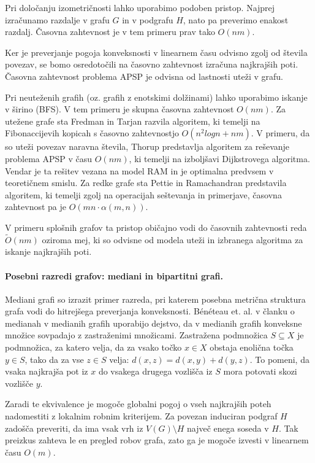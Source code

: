 \documentclass[sigconf
]{acmart}
\theoremstyle{definition}
\begin{document}
Pri določanju izometričnosti lahko uporabimo podoben pristop.
Najprej izračunamo razdalje v grafu \(G\) in v podgrafu \(H\), nato pa preverimo enakost razdalj. Časovna zahtevnost je v tem primeru prav tako \(O(nm)\).

Ker je preverjanje pogoja konveksnosti v linearnem času odvisno zgolj od števila povezav, se bomo osredotočili na časovno zahtevnost izračuna najkrajših poti.
Časovna zahtevnost problema APSP je odvisna od lastnosti uteži v grafu.

Pri neuteženih grafih (oz. grafih z enotskimi dolžinami) lahko uporabimo iskanje v širino (BFS).
V tem primeru je skupna časovna zahtevnost \(O(nm)\).
Za utežene grafe sta Fredman in Tarjan \cite{tarjanFredman1987} razvila algoritem, ki temelji na Fibonaccijevih kopicah s časovno zahtevnostjo \(O(n^2 logn + n m)\).
V primeru, da so uteži povezav naravna števila, Thorup \cite{thorup1999} predstavlja algoritem za reševanje problema APSP v času \(O(nm)\), ki temelji na izboljšavi Dijkstrovega algoritma.
Vendar je ta rešitev vezana na model RAM in je optimalna predvsem v teoretičnem smislu.
Za redke grafe sta Pettie in Ramachandran \cite{pettie2002} predstavila algoritem, ki temelji zgolj na operacijah seštevanja in primerjave, časovna zahtevnost pa je \(O(mn \cdot \alpha(m, n))\).

V primeru splošnih grafov ta pristop običajno vodi do časovnih zahtevnosti reda \(\tilde{O}(nm)\) oziroma mej, ki so odvisne od modela uteži in izbranega algoritma za iskanje najkrajših poti.

\paragraph{Posebni razredi grafov: mediani in bipartitni grafi.}
Mediani grafi so izrazit primer razreda, pri katerem posebna metrična struktura grafa vodi do hitrejšega preverjanja konveksnosti.
Bénéteau et. al. v članku o medianah v medianih grafih \cite{beneteau2022medians} uporabijo dejstvo, da v medianih grafih konveksne množice sovpadajo z zastraženimi množicami.
Zastražena podmnožica $S \subseteq X$ je podmnožica, za katero velja, da za vsako točko \(x \in X\) obstaja enolična točka \(y \in S\), tako da za vse \(z \in S\) velja: \(d(x, z) = d(x, y) + d(y, z).\)
To pomeni, da vsaka najkrajša pot iz $x$ do vsakega drugega vozlišča iz $S$ mora potovati skozi vozlišče $y$.

Zaradi te ekvivalence je mogoče globalni pogoj o vseh
najkrajših poteh nadomestiti z lokalnim robnim kriterijem.
Za povezan induciran podgraf \(H\) zadošča preveriti, da ima vsak vrh iz \(V(G) \setminus H\) največ enega soseda v \(H\).
Tak preizkus zahteva le en pregled robov grafa, zato ga je mogoče izvesti v linearnem času \(O(m)\).
\end{document}
